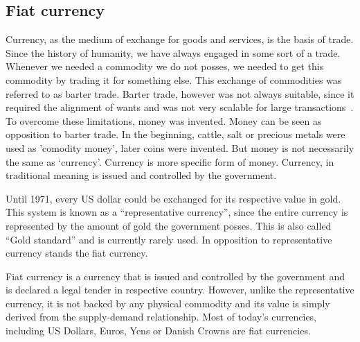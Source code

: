 \subsection{Fiat  currency}
% 
Currency, as the medium of exchange for goods and services, is the basis of trade. Since the history of humanity, we have always engaged in some sort of a trade. Whenever we needed a commodity we do not posses, we needed to get this commodity by trading it for something else. This exchange of commodities was referred to as barter trade. Barter trade, however was not always suitable, since it required the alignment of wants and was not very scalable for large transactions~\cite{Carroll2015CreatingExchange}. To overcome these limitations, money was invented. Money can be seen as opposition to barter trade. In the beginning, cattle, salt or precious metals were used as 'comodity money', later coins were invented. But money is not necessarily the same as `currency'.  Currency is more specific form of money. Currency, in traditional meaning is issued and controlled by the government\footnotemark.
% 

Until 1971, every US dollar could be exchanged for its respective value in gold. This system is known as a ``representative currency'', since the entire currency is represented by the amount of gold the government posses. This is also called ``Gold standard'' and is currently rarely used. In opposition to representative currency stands the fiat currency. 

Fiat currency is a currency that is issued and controlled by the government and is declared a legal tender in respective country. However, unlike the representative currency, it is not backed by any physical commodity and its value is simply derived from the supply-demand relationship\footnotemark. Most of today's currencies, including US Dollars, Euros, Yens or Danish Crowns are fiat currencies.
% 
